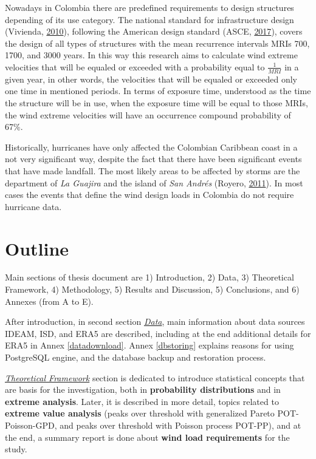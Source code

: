 \documentclass[12pt,oneside]{reedthesis}
\begin{document}
Nowadays in Colombia there are predefined requirements to design structures depending of its use category. The national standard for infrastructure design (Vivienda, \protect\hyperlink{ref-nsr10}{2010}), following the American design standard (ASCE, \protect\hyperlink{ref-Asce2017}{2017}), covers the design of all types of structures with the mean recurrence intervals MRIs 700, 1700, and 3000 years. In this way this research aims to calculate wind extreme velocities that will be equaled or exceeded with a probability equal to \(\frac{1}{MRI}\) in a given year, in other words, the velocities that will be equaled or exceeded only one time in mentioned periods. In terms of exposure time, understood as the time the structure will be in use, when the exposure time will be equal to those MRIs, the wind extreme velocities will have an occurrence compound probability of 67\%.

Historically, hurricanes have only affected the Colombian Caribbean coast in a not very significant way, despite the fact that there have been significant events that have made landfall. The most likely areas to be affected by storms are the department of \emph{La Guajira} and the island of \emph{San Andrés} (Royero, \protect\hyperlink{ref-Royero2011}{2011}). In most cases the events that define the wind design loads in Colombia do not require hurricane data.

\hypertarget{outline}{%
\section{Outline}\label{outline}}

Main sections of thesis document are 1) Introduction, 2) Data, 3) Theoretical Framework, 4) Methodology, 5) Results and Discussion, 5) Conclusions, and 6) Annexes (from A to E).

After introduction, in second section \emph{\protect\hyperlink{rmd-data}{Data}}, main information about data sources IDEAM, ISD, and ERA5 are described, including at the end additional details for ERA5 in Annex \ref{datadownload}. Annex \ref{dbstoring} explains reasons for using PostgreSQL engine, and the database backup and restoration process.

\emph{\protect\hyperlink{rmd-thefra}{Theoretical Framework}} section is dedicated to introduce statistical concepts that are basis for the investigation, both in \textbf{probability distributions} and in \textbf{extreme analysis}. Later, it is described in more detail, topics related to \textbf{extreme value analysis} (peaks over threshold with generalized Pareto POT-Poisson-GPD, and peaks over threshold with Poisson process POT-PP), and at the end, a summary report is done about \textbf{wind load requirements} for the study.
\end{document}
